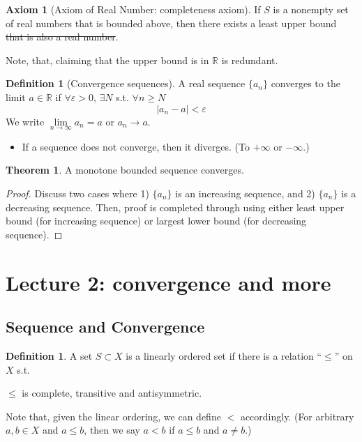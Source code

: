 \documentclass[12pt]{article}
\newcommand{\R}{{\mathbb R}}
\theoremstyle{definition}
\newtheorem{THM}{Theorem}
\newtheorem{axiom}[theorem]{Axiom}
\newtheorem{definition}[theorem]{Definition}
\theoremstyle{plain}
\begin{document}
\begin{axiom}
    [Axiom of Real Number: completeness axiom]
    If $S$ is a nonempty set of real numbers that is bounded above, then there
    exists a least upper bound \sout{that is also a real number}.

    Note, that, claiming that the upper bound is in $\R$ is redundant.

\end{axiom}

\begin{definition}
    [Convergence sequences]
    A real sequence $\{a_n\}$ converges to the limit $a\in \R$ if $\forall
    \varepsilon > 0$, $\exists N$ s.t. $\forall n \ge N$
    \[
        |a_n - a| < \varepsilon
    \]
    We write $\underset{n\to\infty} \lim a_n = a$ or $a_n \to a$.
\end{definition}

\begin{itemize}
    \item If a sequence does not converge, then it diverges. (To $+\infty$ or
        $-\infty$.)
\end{itemize}

\begin{THM}
    A monotone bounded sequence converges.
    \begin{proof}
        Discuss two cases where 1) $\{a_n\}$ is an increasing sequence, and 2) $\{a_n\}$
        is a decreasing sequence. Then, proof is completed through using either
        least upper bound (for increasing sequence) or largest lower bound (for
        decreasing sequence).
    \end{proof}
\end{THM}


\section{Lecture 2: convergence and more}
\setcounter{theorem}{0}

\subsection{Sequence and Convergence}
\begin{definition}
    A set $S \subset X$ is a linearly ordered set if there is a relation
    ``$\le$'' on $X$ s.t.

    \begin{center}
        $\le$ is complete, transitive and antisymmetric.
    \end{center}

    Note that, given the linear ordering, we can define $<$ accordingly.
    (For arbitrary $a,b \in X$ and $a \le b$, then we say $a<b$ if $a \le b$ and
    $a \not = b$.)
\end{definition}
\end{document}
